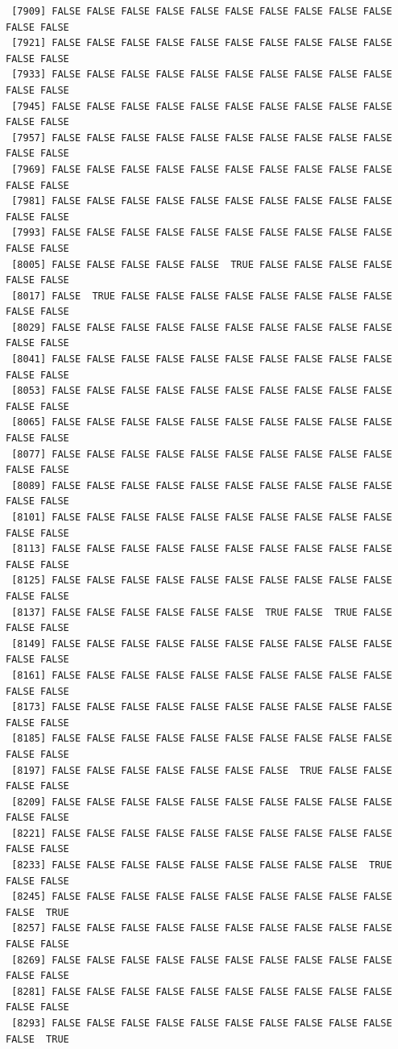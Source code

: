 \documentclass[
  a4paper,
  DIV=11,
  numbers=noendperiod]{scrartcl}
\begin{document}
\begin{verbatim}
 [7909] FALSE FALSE FALSE FALSE FALSE FALSE FALSE FALSE FALSE FALSE FALSE FALSE
 [7921] FALSE FALSE FALSE FALSE FALSE FALSE FALSE FALSE FALSE FALSE FALSE FALSE
 [7933] FALSE FALSE FALSE FALSE FALSE FALSE FALSE FALSE FALSE FALSE FALSE FALSE
 [7945] FALSE FALSE FALSE FALSE FALSE FALSE FALSE FALSE FALSE FALSE FALSE FALSE
 [7957] FALSE FALSE FALSE FALSE FALSE FALSE FALSE FALSE FALSE FALSE FALSE FALSE
 [7969] FALSE FALSE FALSE FALSE FALSE FALSE FALSE FALSE FALSE FALSE FALSE FALSE
 [7981] FALSE FALSE FALSE FALSE FALSE FALSE FALSE FALSE FALSE FALSE FALSE FALSE
 [7993] FALSE FALSE FALSE FALSE FALSE FALSE FALSE FALSE FALSE FALSE FALSE FALSE
 [8005] FALSE FALSE FALSE FALSE FALSE  TRUE FALSE FALSE FALSE FALSE FALSE FALSE
 [8017] FALSE  TRUE FALSE FALSE FALSE FALSE FALSE FALSE FALSE FALSE FALSE FALSE
 [8029] FALSE FALSE FALSE FALSE FALSE FALSE FALSE FALSE FALSE FALSE FALSE FALSE
 [8041] FALSE FALSE FALSE FALSE FALSE FALSE FALSE FALSE FALSE FALSE FALSE FALSE
 [8053] FALSE FALSE FALSE FALSE FALSE FALSE FALSE FALSE FALSE FALSE FALSE FALSE
 [8065] FALSE FALSE FALSE FALSE FALSE FALSE FALSE FALSE FALSE FALSE FALSE FALSE
 [8077] FALSE FALSE FALSE FALSE FALSE FALSE FALSE FALSE FALSE FALSE FALSE FALSE
 [8089] FALSE FALSE FALSE FALSE FALSE FALSE FALSE FALSE FALSE FALSE FALSE FALSE
 [8101] FALSE FALSE FALSE FALSE FALSE FALSE FALSE FALSE FALSE FALSE FALSE FALSE
 [8113] FALSE FALSE FALSE FALSE FALSE FALSE FALSE FALSE FALSE FALSE FALSE FALSE
 [8125] FALSE FALSE FALSE FALSE FALSE FALSE FALSE FALSE FALSE FALSE FALSE FALSE
 [8137] FALSE FALSE FALSE FALSE FALSE FALSE  TRUE FALSE  TRUE FALSE FALSE FALSE
 [8149] FALSE FALSE FALSE FALSE FALSE FALSE FALSE FALSE FALSE FALSE FALSE FALSE
 [8161] FALSE FALSE FALSE FALSE FALSE FALSE FALSE FALSE FALSE FALSE FALSE FALSE
 [8173] FALSE FALSE FALSE FALSE FALSE FALSE FALSE FALSE FALSE FALSE FALSE FALSE
 [8185] FALSE FALSE FALSE FALSE FALSE FALSE FALSE FALSE FALSE FALSE FALSE FALSE
 [8197] FALSE FALSE FALSE FALSE FALSE FALSE FALSE  TRUE FALSE FALSE FALSE FALSE
 [8209] FALSE FALSE FALSE FALSE FALSE FALSE FALSE FALSE FALSE FALSE FALSE FALSE
 [8221] FALSE FALSE FALSE FALSE FALSE FALSE FALSE FALSE FALSE FALSE FALSE FALSE
 [8233] FALSE FALSE FALSE FALSE FALSE FALSE FALSE FALSE FALSE  TRUE FALSE FALSE
 [8245] FALSE FALSE FALSE FALSE FALSE FALSE FALSE FALSE FALSE FALSE FALSE  TRUE
 [8257] FALSE FALSE FALSE FALSE FALSE FALSE FALSE FALSE FALSE FALSE FALSE FALSE
 [8269] FALSE FALSE FALSE FALSE FALSE FALSE FALSE FALSE FALSE FALSE FALSE FALSE
 [8281] FALSE FALSE FALSE FALSE FALSE FALSE FALSE FALSE FALSE FALSE FALSE FALSE
 [8293] FALSE FALSE FALSE FALSE FALSE FALSE FALSE FALSE FALSE FALSE FALSE  TRUE

\end{verbatim}
\end{document}
